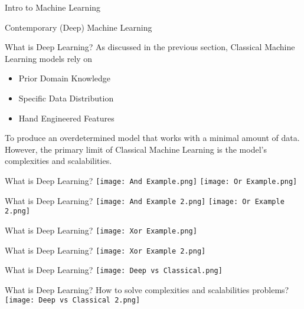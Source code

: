 \documentclass{beamer}
\begin{document}
\begin{frame}[fragile]{Intro to Machine Learning}
    \begin{center}
        \Huge Contemporary (Deep) Machine Learning
    \end{center}
\end{frame}
\begin{frame}[fragile]{What is Deep Learning?}
    As discussed in the previous section, Classical Machine Learning models rely on 
    \begin{itemize}
        \item Prior Domain Knowledge
        \item Specific Data Distribution
        \item Hand Engineered Features
    \end{itemize}
    To produce an overdetermined model that works with a minimal amount of data. However, the primary limit of Classical Machine Learning is the model's complexities and scalabilities.
\end{frame}
\begin{frame}[fragile]{What is Deep Learning?}
    \texttt{[image: And Example.png]}
    \texttt{[image: Or Example.png]}
\end{frame}
\begin{frame}[fragile]{What is Deep Learning?}
    \texttt{[image: And Example 2.png]}
    \texttt{[image: Or Example 2.png]}
\end{frame}
\begin{frame}[fragile]{What is Deep Learning?}
    \texttt{[image: Xor Example.png]}
\end{frame}
\begin{frame}[fragile]{What is Deep Learning?}
    \texttt{[image: Xor Example 2.png]}
\end{frame}
\begin{frame}[fragile]{What is Deep Learning?}
    \texttt{[image: Deep vs Classical.png]}
\end{frame}
\begin{frame}[fragile]{What is Deep Learning?}
    How to solve complexities and scalabilities problems?
    \texttt{[image: Deep vs Classical 2.png]}
\end{frame}
\end{document}
